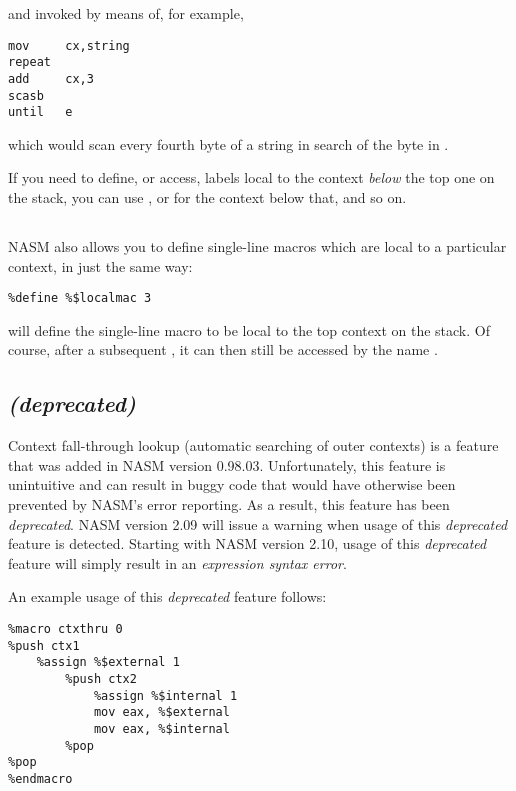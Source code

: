 and invoked by means of, for example,

\begin{lstlisting}
mov     cx,string
repeat
add     cx,3
scasb
until   e
\end{lstlisting}

which would scan every fourth byte of a string in search of the byte
in .

If you need to define, or access, labels local to the context
\emph{below} the top one on the stack, you can use
\indexcode{\%\$\$}, or  for
the context below that, and so on.

\subsection{}
\label{subsec:ctxdefine}

NASM also allows you to define single-line macros which are local to
a particular context, in just the same way:

\begin{lstlisting}
%define %$localmac 3
\end{lstlisting}

will define the single-line macro  to be local to the
top context on the stack. Of course, after a subsequent ,
it can then still be accessed by the name .

\subsection{ \emph{(deprecated)}}
\label{subsec:ctxfallthrough}

Context fall-through lookup (automatic searching of outer contexts)
is a feature that was added in NASM version 0.98.03. Unfortunately,
this feature is unintuitive and can result in buggy code that would
have otherwise been prevented by NASM's error reporting. As a result,
this feature has been \emph{deprecated}. NASM version 2.09 will issue a
warning when usage of this \emph{deprecated} feature is detected. Starting
with NASM version 2.10, usage of this \emph{deprecated} feature will simply
result in an \emph{expression syntax error}.

An example usage of this \emph{deprecated} feature follows:

\begin{lstlisting}
%macro ctxthru 0
%push ctx1
    %assign %$external 1
        %push ctx2
            %assign %$internal 1
            mov eax, %$external
            mov eax, %$internal
        %pop
%pop
%endmacro
\end{lstlisting}

